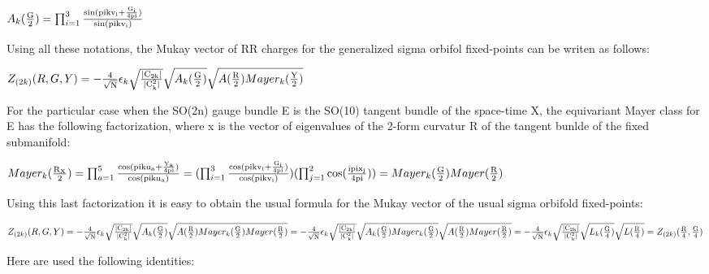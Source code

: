\documentclass[a4paper,a4paper]{article}
\begin{document}
\begin{center}
{  $ A_k(\frac{\rm G}{\rm 2}) = \prod_{i=1}^3\frac{\rm sin(pikv_i+\frac{\rm G_i}{\rm 4pi})}{\rm sin(pikv_i)}$ }
\end{center}

Using all these notations, the Mukay vector of RR charges for the generalized sigma orbifol fixed-points can be writen as follows:

\begin{center}
{  $ Z_{(2k)}(R,G,Y) =-\frac{\rm 4}{\rm \sqrt{N}}\epsilon_k\sqrt{\frac{\rm \vert{\rm C_{2k}}\vert}{\rm\vert{\rm C_k^2}\vert }}\sqrt{A_k(\frac{\rm G}{\rm 2})}\sqrt{A(\frac{\rm R}{\rm 2}) Mayer_k(\frac{\rm Y}{\rm 2})}  $ }
\end{center} 

For the particular case when the SO(2n) gauge bundle E is the SO(10) tangent bundle of the space-time X, the equivariant Mayer class for E has the following factorization, where x is the vector of eigenvalues of the 2-form curvatur R of the tangent bunlde of the fixed submanifold:

\begin{center}
{  $ Mayer_k(\frac{\rm R_X}{\rm 2}) = \prod_{a=1}^5\frac{\rm cos(piku_a+\frac{\rm Y_a}{\rm 4pi})}{\rm cos(piku_a)}=(\prod_{i=1}^3\frac{\rm cos(pikv_i+\frac{\rm G_i}{\rm 4pi})}{\rm cos(pikv_i)})(\prod_{j=1}^2\cos(\frac{\rm ipix_j}{\rm 4pi}))= Mayer_k(\frac{\rm G}{\rm 2})Mayer(\frac{\rm R}{\rm 2})$ }
\end{center}

Using this last factorization it is easy to obtain the usual formula for the Mukay vector of the usual sigma orbifold fixed-points:

\begin{center}
{  $ Z_{(2k)}(R,G,Y) =-\frac{\rm 4}{\rm \sqrt{N}}\epsilon_k\sqrt{\frac{\rm \vert{\rm C_{2k}}\vert}{\rm\vert{\rm C_k^2}\vert }}\sqrt{A_k(\frac{\rm G}{\rm 2})}\sqrt{A(\frac{\rm R}{\rm 2})Mayer_k(\frac{\rm G}{\rm 2})Mayer(\frac{\rm R}{\rm 2}) }=-\frac{\rm 4}{\rm \sqrt{N}}\epsilon_k\sqrt{\frac{\rm \vert{\rm C_{2k}}\vert}{\rm\vert{\rm C_k^2}\vert }}\sqrt{A_k(\frac{\rm G}{\rm 2})Mayer_k(\frac{\rm G}{\rm 2})}\sqrt{A(\frac{\rm R}{\rm 2})Mayer(\frac{\rm R}{\rm 2}) } = -\frac{\rm 4}{\rm \sqrt{N}}\epsilon_k\sqrt{\frac{\rm \vert{\rm C_{2k}}\vert}{\rm\vert{\rm C_k^2}\vert }}\sqrt{L_k(\frac{\rm G}{\rm 4})}\sqrt{L(\frac{\rm R}{\rm 4}) }= Z_{(2k)}(\frac{\rm R}{\rm 4},\frac{\rm G}{\rm 4})$ }
\end{center} 
Here are used the following identities:
\end{document}
